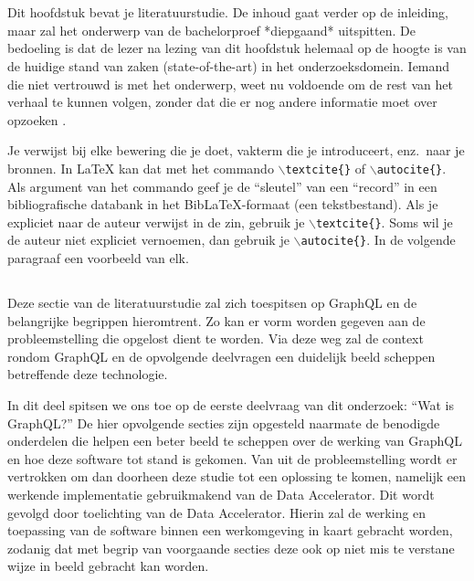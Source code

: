 \chapter{}%
\label{ch:stand-van-zaken}



Dit hoofdstuk bevat je literatuurstudie. De inhoud gaat verder op de inleiding, maar zal het onderwerp van de bachelorproef *diepgaand* uitspitten. De bedoeling is dat de lezer na lezing van dit hoofdstuk helemaal op de hoogte is van de huidige stand van zaken (state-of-the-art) in het onderzoeksdomein. Iemand die niet vertrouwd is met het onderwerp, weet nu voldoende om de rest van het verhaal te kunnen volgen, zonder dat die er nog andere informatie moet over opzoeken \autocite{Pollefliet2011}.

Je verwijst bij elke bewering die je doet, vakterm die je introduceert, enz.\ naar je bronnen. In \LaTeX{} kan dat met het commando \texttt{$\backslash${textcite\{\}}} of \texttt{$\backslash${autocite\{\}}}. Als argument van het commando geef je de ``sleutel'' van een ``record'' in een bibliografische databank in het Bib\LaTeX{}-formaat (een tekstbestand). Als je expliciet naar de auteur verwijst in de zin, gebruik je \texttt{$\backslash${}textcite\{\}}.
Soms wil je de auteur niet expliciet vernoemen, dan gebruik je \texttt{$\backslash${}autocite\{\}}. In de volgende paragraaf een voorbeeld van elk.

\section{}%
\label{sec:GraphQL}
Deze sectie van de literatuurstudie zal zich toespitsen op GraphQL en de belangrijke begrippen hieromtrent. Zo kan er vorm worden gegeven aan de probleemstelling die opgelost dient te worden. Via deze weg zal de context rondom GraphQL en de opvolgende deelvragen een duidelijk beeld scheppen betreffende deze technologie.

In dit deel spitsen we ons toe op de eerste deelvraag van dit onderzoek: “Wat is GraphQL?”
De hier opvolgende secties zijn opgesteld naarmate de benodigde onderdelen die helpen een beter beeld te scheppen over de werking van GraphQL en hoe deze software tot stand is gekomen. Van uit de probleemstelling wordt er vertrokken om dan doorheen deze studie tot een oplossing te komen, namelijk een werkende implementatie gebruikmakend van de Data Accelerator.
Dit wordt gevolgd door toelichting van de Data Accelerator. Hierin zal de werking en toepassing van de software binnen een werkomgeving in kaart gebracht worden, zodanig dat met begrip van voorgaande secties deze ook op niet mis te verstane wijze in beeld gebracht kan worden.

